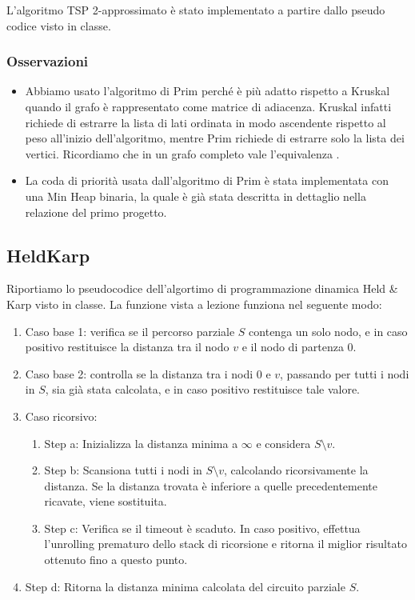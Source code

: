 \noindent L'algoritmo TSP 2-approssimato è stato implementato a partire dallo pseudo codice visto in classe. \\

\subsubsection{Osservazioni}

\begin{itemize}
    \item Abbiamo usato l'algoritmo di Prim perché è più adatto rispetto a Kruskal quando il grafo è rappresentato come matrice di adiacenza. Kruskal infatti richiede di estrarre la lista di lati ordinata in modo ascendente rispetto al peso all'inizio dell'algoritmo, mentre Prim richiede di estrarre solo la lista dei vertici. Ricordiamo che in un grafo completo vale l'equivalenza \complexityCompleteGraph{}.

    \item La coda di priorità usata dall'algoritmo di Prim è stata implementata con una Min Heap binaria, la quale è già stata descritta in dettaglio nella relazione del primo progetto.
\end{itemize}

\subsection{HeldKarp}

Riportiamo lo pseudocodice dell'algortimo di programmazione dinamica Held \& Karp visto in classe. La funzione  vista a lezione funziona nel seguente modo:

\begin{enumerate}
    \item Caso base 1: verifica se il percorso parziale $S$ contenga un solo nodo, e in caso positivo restituisce la distanza tra il nodo $v$ e il nodo di partenza $0$.
    \item Caso base 2: controlla se la distanza tra i nodi $0$ e $v$, passando per tutti i nodi in $S$, sia già stata calcolata, e in caso positivo restituisce tale valore.
    \item Caso ricorsivo:
    \begin{enumerate}
        \item Step a: Inizializza la distanza minima a $\infty$ e considera $S \setminus {v}$.
        \item Step b: Scansiona tutti i nodi in $S \setminus {v}$, calcolando ricorsivamente la distanza. Se la distanza trovata è inferiore a quelle precedentemente ricavate, viene sostituita.
        \item Step c: Verifica se il timeout è scaduto. In caso positivo, effettua l'unrolling prematuro dello stack di ricorsione e ritorna il miglior risultato ottenuto fino a questo punto.
    \end{enumerate}
    \item Step d: Ritorna la distanza minima calcolata del circuito parziale $S$.
\end{enumerate}

